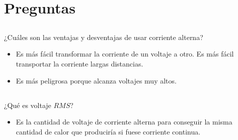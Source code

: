 \documentclass[../main.tex]{subfiles}
\begin{document}
\section{Preguntas}%

\thispagestyle{fancy}

\subsection{}%

¿Cuáles son las ventajas y desventajas de usar corriente alterna?
\begin{itemize}
	\item Es más fácil transformar la corriente de un voltaje a otro.
	Es más fácil transportar la corriente largas distancias.
	\item Es más peligrosa porque alcanza voltajes muy altos.
\end{itemize}

\subsection{}%

¿Qué es voltaje $RMS$?
\begin{itemize}
	\item Es la cantidad de voltaje de corriente alterna para conseguir la
		misma cantidad de calor que produciría si fuese corriente continua.
\end{itemize}
\end{document}
